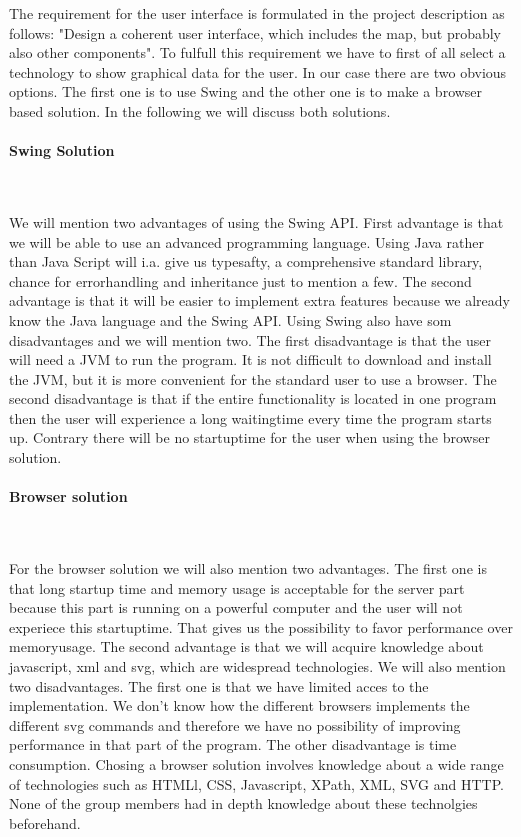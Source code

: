 \documentclass[a4paper,10pt,titlepage]{article}
\begin{document}
The requirement for the user interface is formulated in the project description as follows: "Design a coherent user interface, which includes the map, but probably also other components". To fulfull this requirement we have to first of all select a technology to show graphical data for the user. In our case there are two obvious options. The first one is to use Swing and the other one is to make a browser based solution. In the following we will discuss both solutions.

\paragraph{Swing Solution}\mbox{}\

We will mention two advantages of using the Swing API. First advantage is that we will be able to use an advanced programming language. Using Java rather than Java Script will i.a. give us typesafty, a comprehensive standard library, chance for errorhandling and inheritance just to mention a few. The second advantage is that it will be easier to implement extra features because we already know the Java language and the Swing API. Using Swing also have som disadvantages and we will mention two. The first disadvantage is that the user will need a JVM to run the program. It is not difficult to download and install the JVM, but it is more convenient for the standard user to use a browser. The second disadvantage is that if the entire functionality is located in one program then the user will experience a long waitingtime every time the program starts up. Contrary there will be no startuptime for the user when using the browser solution. 

\paragraph{Browser solution}\mbox{}\

For the browser solution we will also mention two advantages. The first one is that long startup time and memory usage is acceptable for the server part because this part is running on a powerful computer and the user will not experiece this startuptime. That gives us the possibility to favor performance over memoryusage. The second advantage is that we will acquire knowledge about javascript, xml and svg, which are widespread technologies. We will also mention two disadvantages. The first one is that we have limited acces to the implementation. We don't know how the different browsers implements the different svg commands and therefore we have no possibility of improving performance in that part of the program. The other disadvantage is time consumption. Chosing a browser solution involves knowledge about a wide range of technologies such as HTMLl, CSS, Javascript, XPath, XML, SVG and HTTP. None of the group members had in depth knowledge about these technolgies beforehand.    
\end{document}
